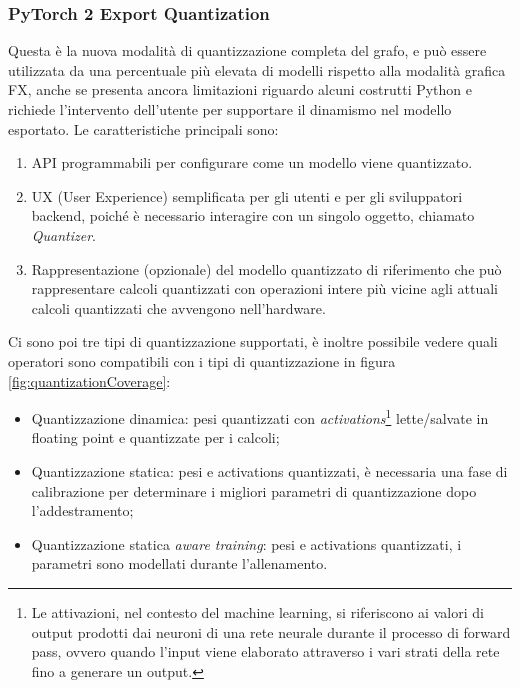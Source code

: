 \subsubsection{PyTorch 2 Export Quantization}
Questa è la nuova modalità di quantizzazione completa del grafo, e può essere utilizzata da una percentuale più elevata di modelli rispetto alla
modalità grafica FX, anche se presenta ancora limitazioni riguardo alcuni costrutti Python e richiede l'intervento dell'utente per supportare il
dinamismo nel modello esportato. Le caratteristiche principali sono:
\begin{enumerate}
    \item API programmabili per configurare come un modello viene quantizzato.
    \item UX (User Experience) semplificata per gli utenti e per gli sviluppatori backend, poiché è necessario interagire con un singolo oggetto, chiamato \textit{Quantizer}.
    \item Rappresentazione (opzionale) del modello quantizzato di riferimento che può rappresentare calcoli quantizzati con operazioni intere più vicine agli attuali calcoli quantizzati che avvengono nell'hardware.
\end{enumerate}

Ci sono poi tre tipi di quantizzazione supportati, è inoltre possibile vedere quali operatori sono compatibili con i tipi di quantizzazione in figura \ref{fig:quantizationCoverage}:
\begin{itemize}
    \item Quantizzazione dinamica: pesi quantizzati con \textit{activations}\footnote{Le attivazioni, nel contesto del machine learning,
    si riferiscono ai valori di output prodotti dai neuroni di una rete neurale durante il processo di forward pass, ovvero quando l'input viene
    elaborato attraverso i vari strati della rete fino a generare un output.} lette/salvate in floating point e quantizzate per i calcoli;
    \item Quantizzazione statica: pesi e activations quantizzati, è necessaria una fase di calibrazione per determinare i migliori parametri di quantizzazione dopo l'addestramento;
    \item Quantizzazione statica \textit{aware training}: pesi e activations quantizzati, i parametri sono modellati durante l'allenamento.
\end{itemize}

